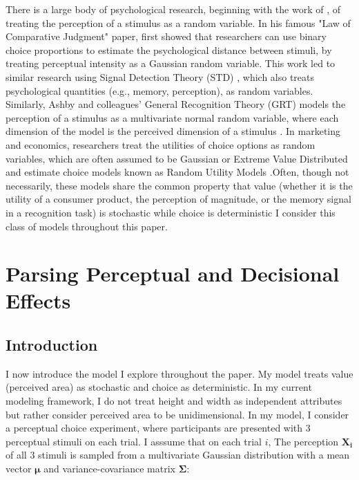 \documentclass{umassthesis}          %
\begin{document}
There is a large body of psychological research, beginning with the work of \textcite{thurstone1927law}, of treating the perception of a stimulus as a random variable. In his famous "Law of Comparative Judgment" paper, \textcite{thurstone1927law} first showed that researchers can use binary choice proportions to estimate the psychological distance between stimuli, by treating perceptual intensity as a Gaussian random variable. This work led to similar research using Signal Detection Theory (STD) \parencite{hautus2021detection}, which also treats psychological quantities (e.g., memory, perception), as random variables. Similarly, Ashby and colleagues' General Recognition Theory (GRT) models the perception of a stimulus as a multivariate normal random variable, where each dimension of the model is the perceived dimension of a stimulus \parencite{ashbyVarietiesPerceptualIndependence1986a,ashby1988decision, ashbyUnifiedTheorySimilarity}. In marketing and economics, researchers treat the utilities of choice options as random variables, which are often assumed to be Gaussian or Extreme Value Distributed and estimate choice models known as Random Utility Models \parencite[RUMs,]{mcfadden2001economic,hausman1978conditional,train2009discrete}.Often, though not necessarily, these models share the common property that value (whether it is the utility of a consumer product, the perception of magnitude, or the memory signal in a recognition task) is stochastic while choice is deterministic \parencite[c.f.,]{benjamin2009signal} I consider this class of models throughout this paper.


\chapter{Parsing Perceptual and Decisional Effects}

\section{Introduction}

I now introduce the model I explore throughout the paper. My model treats value (perceived area) as stochastic and choice as deterministic. In my current modeling framework, I do not treat height and width as independent attributes but rather consider perceived area to be unidimensional. In my model, I consider a perceptual choice experiment, where participants are presented with 3 perceptual stimuli on each trial. I asssume that on each trial $i$, The perception $\mathbf{X_i}$ of all 3 stimuli is sampled from a multivariate Gaussian distribution with a mean vector $\mathbf{\mu}$ and variance-covariance matrix $\mathbf{\Sigma}$:
\end{document}
